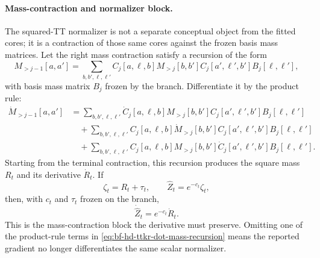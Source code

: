 \paragraph{Mass-contraction and normalizer block.}
The squared-TT normalizer is not a separate conceptual object from the fitted
cores; it is a contraction of those same cores against the frozen basis mass
matrices.  Let the right mass contraction satisfy a recursion of the form
\begin{equation}
  M_{>j-1}[a,a']=
  \sum_{b,b',\ell,\ell'}
  C_j[a,\ell,b]
  M_{>j}[b,b']
  C_j[a',\ell',b']
  B_j[\ell,\ell'],
  \label{eq:bf-hd-ttkr-mass-recursion}
\end{equation}
with basis mass matrix \(B_j\) frozen by the branch.  Differentiate it by the
product rule:
\begin{equation}
\begin{aligned}
  \dot M_{>j-1}[a,a']
  &=
  \sum_{b,b',\ell,\ell'}
  \dot C_j[a,\ell,b]
  M_{>j}[b,b']
  C_j[a',\ell',b']
  B_j[\ell,\ell']\\
  &\quad+
  \sum_{b,b',\ell,\ell'}
  C_j[a,\ell,b]
  \dot M_{>j}[b,b']
  C_j[a',\ell',b']
  B_j[\ell,\ell']\\
  &\quad+
  \sum_{b,b',\ell,\ell'}
  C_j[a,\ell,b]
  M_{>j}[b,b']
  \dot C_j[a',\ell',b']
  B_j[\ell,\ell'].
\end{aligned}
  \label{eq:bf-hd-ttkr-dot-mass-recursion}
\end{equation}
Starting from the terminal contraction, this recursion produces the square mass
\(R_t\) and its derivative \(\dot R_t\).  If
\begin{equation}
  \zeta_t=R_t+\tau_t,
  \qquad
  \widehat Z_t=e^{-c_t}\zeta_t,
  \label{eq:bf-hd-ttkr-normalizer-block}
\end{equation}
then, with \(c_t\) and \(\tau_t\) frozen on the branch,
\begin{equation}
  \dot{\widehat Z}_t=e^{-c_t}\dot R_t.
  \label{eq:bf-hd-ttkr-dot-normalizer}
\end{equation}
This is the mass-contraction block the derivative must preserve.  Omitting one of
the product-rule terms in \eqref{eq:bf-hd-ttkr-dot-mass-recursion} means the
reported gradient no longer differentiates the same scalar normalizer.

